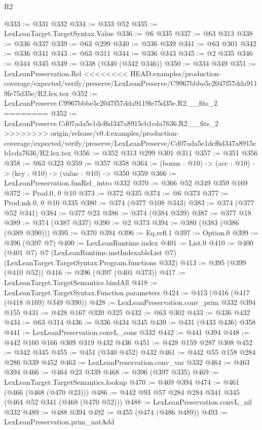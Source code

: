 \begin{lexlean}{R2}
\begin{coremodule}
{{{{{{{{{{{{{{{{{{{{{{@333 := @331 @332
@334 := @333 @52
@335 := LexLeanTarget.TargetSyntax.Value
@336 := @6 @335
@337 := @63 @313
@338 := @336 @337
@339 := @63 @299
@340 := @336 @339
@341 := @63 @301
@342 := @336 @341
@343 := @63 @311
@344 := @336 @343
@345 := @2 @335
@346 := @344 @345
@349 := @338 (@340 (@342 @346))
@350 := @334 @349
@351 := LexLeanPreservation.Rel
<<<<<<<< HEAD:examples/production-coverage/expected/verify/preserve/LexLeanPreserve/C9967bbbe5c2047f57dda9119fe75d35e/R2.lex.tex
@352 := LexLeanPreserve.C9967bbbe5c2047f57dda9119fe75d35e.R2.__fits_2
========
@352 := LexLeanPreserve.Cd07ada5e1dcf6d347a8915cb1cda7636.R2.__fits_2
>>>>>>>> origin/release/v0.4:examples/production-coverage/expected/verify/preserve/LexLeanPreserve/Cd07ada5e1dcf6d347a8915cb1cda7636/R2.lex.tex
@356 := @352 @313 @299 @301 @311
@357 := @351 @356
@358 := @63 @323
@359 := @357 @358
@364 := (bonus : @10) -> (acc : @10) -> (key : @10) -> (value : @10) -> @350 @359
@366 := LexLeanPreservation.funRel_intro @332
@370 := @366 @52 @349 @359 @169
@372 := Prod.{0, 0} @10
@373 := @372 @335
@374 := @6 @373
@377 := Prod.mk.{0, 0} @10 @335
@380 := @374 (@377 @108 @343)
@383 := @374 (@377 @52 @341)
@384 := @377 @23
@386 := @374 (@384 @339)
@387 := @377 @18
@389 := @374 (@387 @337)
@390 := @2 @373
@394 := @380 (@383 (@386 (@389 @390)))
@395 := @370 @394
@396 := Eq.refl.{1}
@397 := Option.{0}
@399 := @396 (@397 @7)
@400 := LexLeanRuntime.index
@401 := List.{0}
@410 := @400
    (@401 @7)
    @7
    (LexLeanRuntime.instIndexableList @7)
    (LexLeanTarget.TargetSyntax.Program.functions @332)
@413 := @395 (@399 (@410 @52))
@416 := @396 (@397 (@401 @373))
@417 := LexLeanTarget.TargetSemantics.bindAll
@418 := LexLeanTarget.TargetSyntax.Function.parameters
@424 := @413 (@416 (@417 (@418 @169) @349 @390))
@428 := LexLeanPreservation.conv_prim @332 @394 @155
@431 := @428 @167 @320 @325
@432 := @63 @302
@433 := @336 @432
@434 := @63 @314
@436 := @336 @434 @345
@439 := @431 (@433 @436) @358
@441 := LexLeanPreservation.convL_cons @332
@442 := @441 @394
@448 := @442 @160 @166 @309 @319 @432 @436
@451 := @428 @159 @287 @308
@452 := @342 @345
@455 := @451 (@340 @452) @432
@461 := @442 @55 @158 @284 @286 @339 @452
@463 := LexLeanPreservation.conv_var @332
@464 := @463 @394
@466 := @464 @23 @339
@468 := @396 (@397 @335)
@469 := LexLeanTarget.TargetSemantics.lookup
@470 := @469 @394
@474 := @461 (@466 (@468 (@470 @23)))
@486 := @442 @93 @57 @284 @284 @341 @345 (@464 @52 @341 (@468 (@470 @52)))
@488 := LexLeanPreservation.convL_nil @332
@489 := @488 @394
@492 := @455 (@474 (@486 @489))
@493 := LexLeanPreservation.prim_natAdd
}}}}}}}}}}}}}}}}}}}}}}
\end{coremodule}
\end{lexlean}
